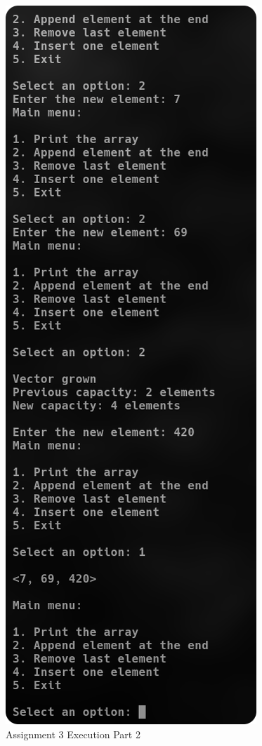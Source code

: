 \documentclass[
	letterpaper, %
	10pt, %
]{CSUniSchoolLabReport}
\begin{document}
  \begin{figure}[H]
    \centering
    \includegraphics[height=.8\textheight]{Figures/6_3-2.png}
    \caption{Assignment 3 Execution Part 2}
    \label{fig:5}
  \end{figure}
\end{document}
